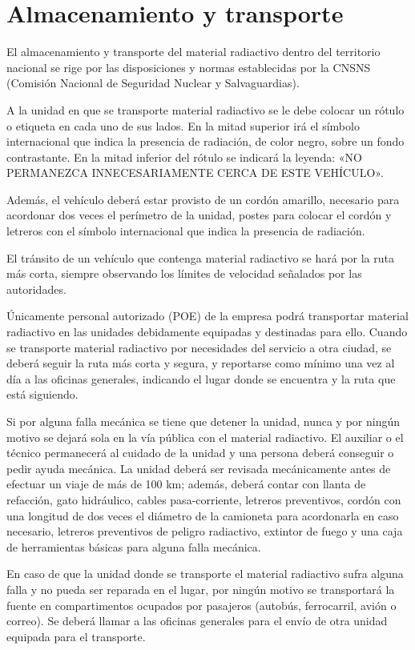 \section{Almacenamiento y transporte}

El almacenamiento y transporte del material radiactivo dentro del territorio nacional se rige por las disposiciones y normas establecidas por la CNSNS (Comisión Nacional de Seguridad Nuclear y Salvaguardias).

A la unidad en que se transporte material radiactivo se le debe colocar un rótulo o etiqueta en cada uno de sus lados. En la mitad superior irá el símbolo internacional que indica la presencia de radiación, de color negro, sobre un fondo contrastante. En la mitad inferior del rótulo se indicará la leyenda: «NO PERMANEZCA INNECESARIAMENTE CERCA DE ESTE VEHÍCULO».

Además, el vehículo deberá estar provisto de un cordón amarillo, necesario para acordonar dos veces el perímetro de la unidad, postes para colocar el cordón y letreros con el símbolo internacional que indica la presencia de radiación.

El tránsito de un vehículo que contenga material radiactivo se hará por la ruta más corta, siempre observando los límites de velocidad señalados por las autoridades.

Únicamente personal autorizado (POE) de la empresa podrá transportar material radiactivo en las unidades debidamente equipadas y destinadas para ello. Cuando se transporte material radiactivo por necesidades del servicio a otra ciudad, se deberá seguir la ruta más corta y segura, y reportarse como mínimo una vez al día a las oficinas generales, indicando el lugar donde se encuentra y la ruta que está siguiendo.

Si por alguna falla mecánica se tiene que detener la unidad, nunca y por ningún motivo se dejará sola en la vía pública con el material radiactivo. El auxiliar o el técnico permanecerá al cuidado de la unidad y una persona deberá conseguir o pedir ayuda mecánica. La unidad deberá ser revisada mecánicamente antes de efectuar un viaje de más de 100 km; además, deberá contar con llanta de refacción, gato hidráulico, cables pasa-corriente, letreros preventivos, cordón con una longitud de dos veces el diámetro de la camioneta para acordonarla en caso necesario, letreros preventivos de peligro radiactivo, extintor de fuego y una caja de herramientas básicas para alguna falla mecánica.

En caso de que la unidad donde se transporte el material radiactivo sufra alguna falla y no pueda ser reparada en el lugar, por ningún motivo se transportará la fuente en compartimentos ocupados por pasajeros (autobús, ferrocarril, avión o correo). Se deberá llamar a las oficinas generales para el envío de otra unidad equipada para el transporte.

